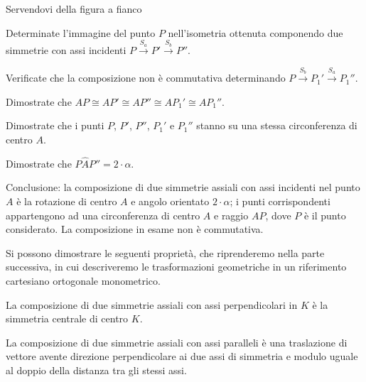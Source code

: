 \noindent\begin{minipage}{0.6\textwidth}\parindent15pt
\begin{esempio}
Servendovi della figura a fianco
\begin{itemize*}
\item Determinate l'immagine del punto \(P\) nell'isometria ottenuta 
componendo due simmetrie con assi incidenti 
\(P\overset{S_a}\rightarrow P' \overset{S_b}\rightarrow P''\).
\item Verificate che la composizione non è commutativa determinando 
\(P\overset{S_b}\rightarrow P_1' \overset{S_a}\rightarrow P_1''\).
\item Dimostrate che \(AP \cong AP'\cong AP''\cong AP_1' \cong AP_1''\).
\item Dimostrate che i punti \(P\), \(P'\), \(P''\), \(P_1'\) e \(P_1''\) 
stanno su una stessa circonferenza di centro \(A\).
\item Dimostrate che \(P\widehat{A}P''=2\cdot \alpha\).
\end{itemize*}
\end{esempio}
\end{minipage}\hfil
\begin{minipage}{0.4\textwidth}
  \centering
\end{minipage}\vspace{5pt}
      
Conclusione: la composizione di due simmetrie assiali con assi 
incidenti nel punto \(A\) è la rotazione di centro \(A\) e angolo 
orientato \(2\cdot \alpha\); i punti corrispondenti appartengono ad una 
circonferenza di centro \(A\) e raggio \(AP\), dove \(P\) è il punto 
considerato. La composizione in esame non è commutativa.

Si possono dimostrare le seguenti proprietà, che riprenderemo nella parte 
successiva, in cui descriveremo le trasformazioni geometriche in un riferimento 
cartesiano ortogonale monometrico.

\begin{proposizione}
La composizione di due simmetrie assiali con assi 
perpendicolari in \(K\) è la simmetria centrale di centro \(K\). 
\end{proposizione}

\begin{proposizione}
La composizione di due simmetrie assiali con assi paralleli è una 
traslazione di vettore avente direzione perpendicolare ai due assi di 
simmetria e modulo uguale al doppio della distanza tra gli stessi 
assi.
\end{proposizione}
      
